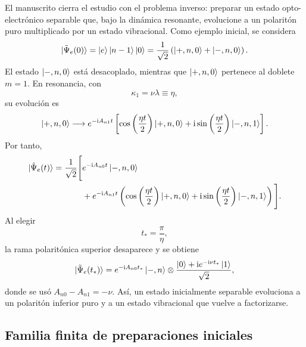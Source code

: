 El manuscrito cierra el estudio con el problema inverso: preparar un estado
opto-electr\'onico separable que, bajo la din\'amica resonante, evolucione a un
polarit\'on puro multiplicado por un estado vibracional. Como ejemplo inicial,
se considera
\begin{equation}
  \ket{\tilde\Psi_e(0)}
  =
  \ket e\ket{n-1}\ket 0
  =
  \frac{1}{\sqrt2}
  \left(
  \ket{+,n,0}+\ket{-,n,0}
  \right).
\end{equation}
El estado $\ket{-,n,0}$ est\'a desacoplado, mientras que $\ket{+,n,0}$
pertenece al doblete $m=1$. En resonancia, con
\begin{equation}
  \kappa_1=\nu\lambda\equiv\eta,
\end{equation}
su evoluci\'on es
\begin{equation}
  \ket{+,n,0}
  \longrightarrow
  e^{-\mathrm{i} A_{n1}t}
  \left[
  \cos\left(\frac{\eta t}{2}\right)\ket{+,n,0}
  +\mathrm{i}\sin\left(\frac{\eta t}{2}\right)\ket{-,n,1}
  \right].
\end{equation}
Por tanto,
\begin{equation}
\begin{aligned}
  \ket{\tilde\Psi_e(t)}
  =\frac{1}{\sqrt2}\Bigg[&
  e^{-\mathrm{i} A_{n0}t}\ket{-,n,0}
  \\
  &+e^{-\mathrm{i} A_{n1}t}
  \left(
  \cos\left(\frac{\eta t}{2}\right)\ket{+,n,0}
  +\mathrm{i}\sin\left(\frac{\eta t}{2}\right)\ket{-,n,1}
  \right)
  \Bigg].
\end{aligned}
\end{equation}
Al elegir
\begin{equation}
  t_*=\frac{\pi}{\eta},
\end{equation}
la rama polarit\'onica superior desaparece y se obtiene
\begin{equation}
  \ket{\tilde\Psi_e(t_*)}
  =
  e^{-\mathrm{i} A_{n0}t_*}\ket{-,n}
  \otimes
  \frac{\ket 0+\mathrm{i} e^{-\mathrm{i}\nu t_*}\ket 1}{\sqrt2},
\end{equation}
donde se us\'o $A_{n0}-A_{n1}=-\nu$. As\'i, un estado inicialmente separable
evoluciona a un polarit\'on inferior puro y a un estado vibracional que vuelve
a factorizarse.

\subsection{Familia finita de preparaciones iniciales}

